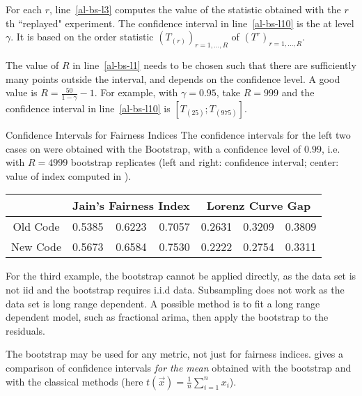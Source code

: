 For each $r$, line~\ref{al-bs-l3} computes the
value of the statistic obtained with the $r$th
``replayed" experiment. The confidence interval
in line~\ref{al-bs-l10} is the  at level $\gamma$. It is
based on the order statistic
$(T_{(r)})_{r=1,...,R}$ of $(T^r)_{r=1,...,R}$.

The value of $R$ in line~\ref{al-bs-l1} needs to be chosen such
that there are sufficiently many points outside the interval,
and depends on the confidence level. A good value is
$R=\frac{50}{1-\gamma}-1$. For example, with $\gamma=0.95$,
take $R=999$ and the confidence interval in
line~\ref{al-bs-l10} is $\left[T_{(25)};T_{(975)}\right]$.

\begin{ex}{Confidence Intervals for Fairness Indices} The confidence
intervals for the left two cases on
 were obtained with the
Bootstrap, with a confidence level of $0.99$,
i.e. with $R=4999$ bootstrap replicates (left and
right: confidence interval; center: value of
index computed in ).
 \begin{center}
\begin{tabular}{|c|lcr|lcr|}
  \hline
   &
   \multicolumn{3}{c|}{Jain's Fairness Index}
   &
   \multicolumn{3}{c|}{Lorenz Curve Gap}
   \\ \hline \hline
  Old Code & 0.5385  &  0.6223  &  0.7057 &  0.2631  &  0.3209  &  0.3809  \\
  New Code & 0.5673 &   0.6584 &   0.7530 &0.2222  &  0.2754  &  0.3311   \\
 \hline
\end{tabular}
\end{center}
For the third example, the bootstrap cannot be applied
directly, as the data set is not iid and the bootstrap requires
i.i.d data. Subsampling does not work as the data set is long
range dependent. A possible method is to fit a long range
dependent model, such as fractional arima, then apply the
bootstrap to the residuals.
\end{ex}

The bootstrap may be used for any metric, not just for fairness
indices.  gives a comparison of confidence
intervals \emph{for the mean} obtained with the bootstrap and
with the classical methods (here
$t(\vec{x})=\frac{1}{n}\sum_{i=1}^n x_i$).

